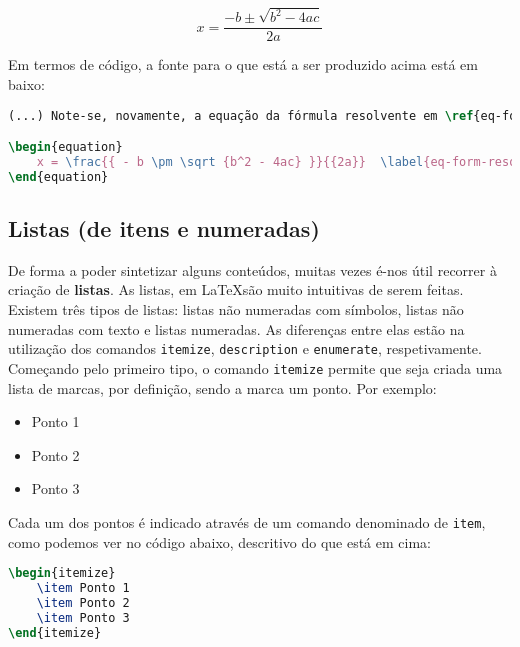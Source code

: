 \documentclass[a4paper, onecolumn, 10pt]{report}
\begin{document}
\begin{equation}
    x = \frac{{ - b \pm \sqrt {b^2 - 4ac} }}{{2a}}  \label{eq-form-resolvente}
\end{equation}

Em termos de código, a fonte para o que está a ser produzido acima está em baixo:

\begin{lstlisting}[language=TeX]
(...) Note-se, novamente, a equação da fórmula resolvente em \ref{eq-form-resolvente}.

\begin{equation}
    x = \frac{{ - b \pm \sqrt {b^2 - 4ac} }}{{2a}}  \label{eq-form-resolvente}
\end{equation}
\end{lstlisting}

\subsection{Listas (de itens e numeradas)}
De forma a poder sintetizar alguns conteúdos, muitas vezes é-nos útil recorrer à criação de \textbf{listas}. As listas, em \LaTeX são muito intuitivas de serem feitas. Existem
três tipos de listas: listas não numeradas com símbolos, listas não numeradas com texto e listas numeradas. As diferenças entre elas estão na utilização dos comandos \texttt{itemize},
\texttt{description} e \texttt{enumerate}, respetivamente. \\
Começando pelo primeiro tipo, o comando \texttt{itemize} permite que seja criada uma lista de marcas, por definição, sendo a marca um ponto. Por exemplo:

\begin{itemize}
    \item Ponto 1
    \item Ponto 2
    \item Ponto 3
\end{itemize}

Cada um dos pontos é indicado através de um comando denominado de \texttt{item}, como podemos ver no código abaixo, descritivo do que está em cima:

\begin{lstlisting}[language=TeX]
\begin{itemize}
    \item Ponto 1
    \item Ponto 2
    \item Ponto 3
\end{itemize}
\end{lstlisting}
\end{document}
